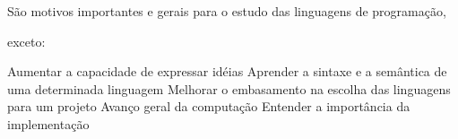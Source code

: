 \documentclass[12pt, addpoints]{exam}
\begin{document}
\begin{questions}
\begin{choices}
\end{choices}

\question

São motivos importantes e gerais para o estudo das linguagens de programação,

exceto:
\begin{choices}
\choice Aumentar a capacidade de expressar idéias
\choice Aprender a sintaxe e a semântica de uma determinada linguagem
\choice Melhorar o embasamento na escolha das linguagens para um projeto
\choice Avanço geral da computação
\choice Entender a importância da implementação
\end{choices}



    \end{questions}
    
\end{document}
